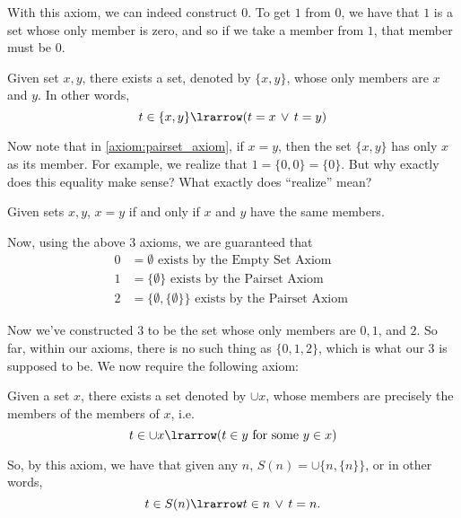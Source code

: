 \documentclass[notoc,notitlepage]{tufte-book}
\begin{document}
With this axiom, we can indeed construct $0$. To get $1$ from $0$, we have that $1$ is a set whose only member is zero, and so if we take a member from $1$, that member must be $0$.

\begin{axiom}
\label{axiom:pairset_axiom}
  Given set $x, y$, there exists a set, denoted by $\{x , y\}$, whose only members are $x$ and $y$. In other words,
  \begin{equation*}
    t \in \{ x, y \} \lrarrow ( t = x \, \lor \, t = y )
  \end{equation*}
\end{axiom}

Now note that in \cref{axiom:pairset_axiom}, if $x = y$, then the set $\{x, y\}$ has only $x$ as its member. For example, we realize that $1 = \{ 0, 0 \} = \{ 0 \}$. But why exactly does this equality make sense? What exactly does ``realize'' mean?

\begin{axiom}
\label{axiom:axiom_of_extension}
  Given sets $x, y$, $x = y$ if and only if $x$ and $y$ have the same members.
\end{axiom}

Now, using the above 3 axioms, we are guaranteed that
\begin{align*}
  0 &= \emptyset \text{ exists by the Empty Set Axiom } \\
  1 &= \{ \emptyset \} \text{ exists by the Pairset Axiom } \\
  2 &= \{ \emptyset, \{ \emptyset \} \} \text{ exists by the Pairset Axiom }
\end{align*}

Now we've constructed $3$ to be the set whose only members are $0, 1$, and $2$. So far, within our axioms, there is no such thing as $\{0, 1, 2\}$, which is what our $3$ is supposed to be. We now require the following axiom:

\begin{axiom}
\label{axiom:union_set_axiom}
  Given a set $x$, there exists a set denoted by $\cup x$, whose members are precisely the members of the members of $x$, i.e.
  \begin{equation*}
    t \in \cup x \lrarrow ( t \in y \text{ for some } y \in x )
  \end{equation*}
\end{axiom}

So, by this axiom, we have that given any $n$, $S(n) = \cup \{ n, \{ n \} \}$, or in other words,
\begin{equation*}
  t \in S(n) \lrarrow t \in n \, \lor \, t = n.
\end{equation*}
\end{document}
